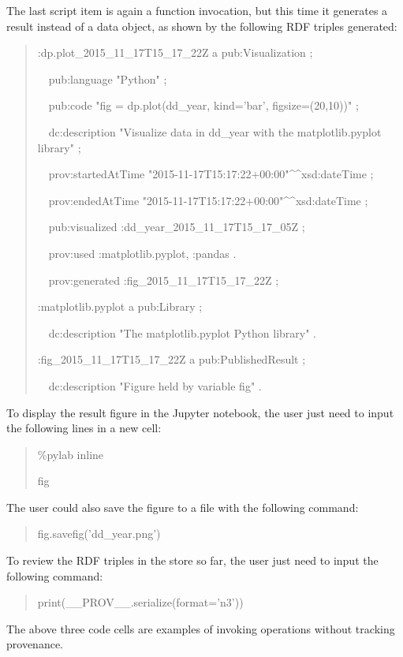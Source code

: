 The last script item is again a function invocation, but this time it generates a result instead of a data object, as shown by the following RDF triples generated:
\begin{quotation}
	\noindent:dp.plot\_2015\_11\_17T15\_17\_22Z a pub:Visualization ;
	
	\noindent\ \ pub:language "Python" ;
	
	\noindent\ \ pub:code "fig = dp.plot(dd\_year, kind='bar', figsize=(20,10))" ;
	
	\noindent\ \ dc:description "Visualize data in dd\_year with the matplotlib.pyplot library" ;
	
	\noindent\ \ prov:startedAtTime "2015-11-17T15:17:22+00:00"\^{}\^{}xsd:dateTime ;
	
	\noindent\ \ prov:endedAtTime "2015-11-17T15:17:22+00:00"\^{}\^{}xsd:dateTime ;
	
	\noindent\ \ pub:visualized :dd\_year\_2015\_11\_17T15\_17\_05Z ;
	
	\noindent\ \ prov:used :matplotlib.pyplot, :pandas .
	
	\noindent\ \ prov:generated :fig\_2015\_11\_17T15\_17\_22Z ;
	
	\noindent:matplotlib.pyplot a pub:Library ;
	
	\noindent\ \ dc:description "The matplotlib.pyplot Python library" .
	
	\noindent:fig\_2015\_11\_17T15\_17\_22Z a pub:PublishedResult ;
	
	\noindent\ \ dc:description "Figure held by variable fig" .
\end{quotation}
To display the result figure in the Jupyter notebook, the user just need to input the following lines in a new cell:
\begin{quotation}
\noindent\%pylab inline

\noindent fig
\end{quotation}
The user could also save the figure to a file with the following command:
\begin{quotation}
	\noindent fig.savefig('dd\_year.png')
\end{quotation}
To review the RDF triples in the store so far, the user just need to input the following command:
\begin{quotation}
	\noindent print(\_\_PROV\_\_.serialize(format='n3'))
\end{quotation}
The above three code cells are examples of invoking operations without tracking provenance.

